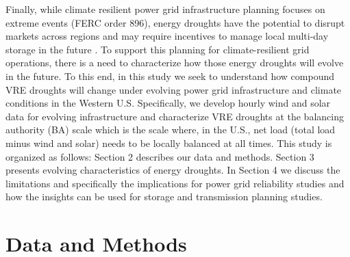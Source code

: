\documentclass{agujournal2019}
\begin{document}
Finally, while climate resilient power grid infrastructure planning focuses on extreme events (FERC order 896), energy droughts have the potential to disrupt markets across regions \cite{Hill_2021} and may require incentives to manage local multi-day storage in the future \cite{Bracken2024}. To support this planning for climate-resilient grid operations, there is a need to characterize how those energy droughts will evolve in the future.  To this end, in this study we seek to understand how compound VRE droughts will change under evolving power grid infrastructure and climate conditions in the Western U.S. Specifically, we develop hourly wind and solar data for evolving infrastructure and characterize VRE droughts at the balancing authority (BA) scale which is the scale where, in the U.S., net load (total load minus wind and solar) needs to be locally balanced at all times. This study is organized as follows: Section 2 describes our data and methods. Section 3 presents evolving characteristics of energy droughts. In Section 4 we discuss the limitations and specifically the implications for power grid reliability studies and how the insights can be used for storage and transmission planning studies. 

\section{Data and Methods}
\end{document}
